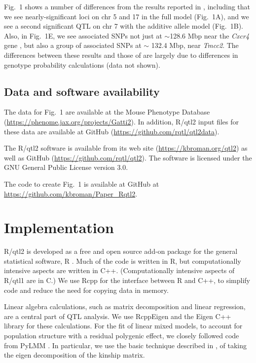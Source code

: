 \documentclass[12pt,letterpaper]{article}
\begin{document}
Fig.~1 shows a number of differences from the results reported in
\citet{gatti2014}, including that we see nearly-significant loci on
chr 5 and 17 in the full model (Fig.~1A), and we see a second
significant QTL on chr 7 with the additive allele model (Fig.~1B).
Also, in Fig.~1E,  we see associated
SNPs not just at $\sim$128.6 Mbp near the \emph{Cxcr4\/} gene
\citep[as in][]{gatti2014}, but also a
group of associated SNPs at $\sim$ 132.4 Mbp, near \emph{Tmcc2}. The
differences between these results and those of \citet{gatti2014} are
largely due to differences in genotype probability calculations (data
not shown).

\subsection*{Data and software availability}

The data for Fig.~1 are available at the Mouse Phenotype Database
(\url{https://phenome.jax.org/projects/Gatti2}). In addition, R/qtl2
input files for these data are available at GitHub
(\url{https://github.com/rqtl/qtl2data}).

The R/qtl2 software is available from its web site
(\url{https://kbroman.org/qtl2}) as well as GitHub
(\url{https://github.com/rqtl/qtl2}). The software is licensed under
the GNU General Public License version 3.0.

The code to create Fig.~1 is available at GitHub at
\url{https://github.com/kbroman/Paper_Rqtl2}.

\clearpage
\section*{Implementation}

R/qtl2 is developed as a free and open source
add-on package for the general statistical software, R
\citep{RCore}. Much of the code is written in R, but computationally
intensive aspects are written in C++.  (Computationally intensive
aspects of R/qtl1 are in C.) We use Rcpp
\citep{eddelbuettel2011,Rcppbook} for the interface between R and C++,
to simplify code and reduce the need for copying data in memory.

Linear algebra calculations, such as matrix decomposition and linear
regression, are a central part of QTL analysis. We use
RcppEigen \citep{RcppEigen} and the Eigen C++ library \citep{eigen}
for these calculations. For the fit of linear mixed models, to account
for population structure with a residual polygenic effect, we closely
followed code from PyLMM \citep{pylmm}. In particular, we use the
basic technique described in \citet{kang2008}, of taking the eigen
decomposition of the kinship matrix.
\end{document}
